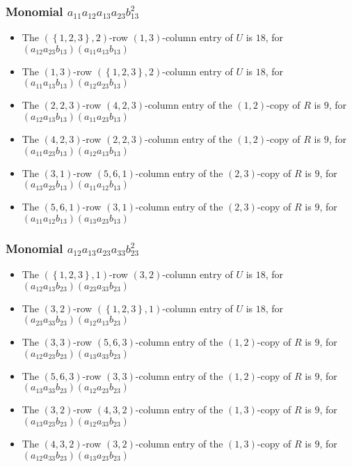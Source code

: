 \documentclass{article}
\begin{document}
\subsubsection{Monomial $ a_{11} a_{12} a_{13} a_{23} b_{13}^{2} $}

\begin{itemize}
\item The $ \left(\left\{1, 2, 3\right\}, 2\right) $-row $ \left(1, 3\right) $-column entry of $U$ is $ 18 $, for $( a_{12} a_{23} b_{13} )( a_{11} a_{13} b_{13} )$ 
\item The $ \left(1, 3\right) $-row $ \left(\left\{1, 2, 3\right\}, 2\right) $-column entry of $U$ is $ 18 $, for $( a_{11} a_{13} b_{13} )( a_{12} a_{23} b_{13} )$ 
\item The $(2, 2, 3)$-row $(4, 2, 3)$-column entry of the $ \left(1, 2\right) $-copy of $R$ is $ 9 $, for $( a_{12} a_{13} b_{13} )( a_{11} a_{23} b_{13} )$ 
\item The $(4, 2, 3)$-row $(2, 2, 3)$-column entry of the $ \left(1, 2\right) $-copy of $R$ is $ 9 $, for $( a_{11} a_{23} b_{13} )( a_{12} a_{13} b_{13} )$ 
\item The $(3, 1)$-row $(5, 6, 1)$-column entry of the $ \left(2, 3\right) $-copy of $R$ is $ 9 $, for $( a_{13} a_{23} b_{13} )( a_{11} a_{12} b_{13} )$ 
\item The $(5, 6, 1)$-row $(3, 1)$-column entry of the $ \left(2, 3\right) $-copy of $R$ is $ 9 $, for $( a_{11} a_{12} b_{13} )( a_{13} a_{23} b_{13} )$ 
\end{itemize}
\subsubsection{Monomial $ a_{12} a_{13} a_{23} a_{33} b_{23}^{2} $}

\begin{itemize}
\item The $ \left(\left\{1, 2, 3\right\}, 1\right) $-row $ \left(3, 2\right) $-column entry of $U$ is $ 18 $, for $( a_{12} a_{13} b_{23} )( a_{23} a_{33} b_{23} )$ 
\item The $ \left(3, 2\right) $-row $ \left(\left\{1, 2, 3\right\}, 1\right) $-column entry of $U$ is $ 18 $, for $( a_{23} a_{33} b_{23} )( a_{12} a_{13} b_{23} )$ 
\item The $(3, 3)$-row $(5, 6, 3)$-column entry of the $ \left(1, 2\right) $-copy of $R$ is $ 9 $, for $( a_{12} a_{23} b_{23} )( a_{13} a_{33} b_{23} )$ 
\item The $(5, 6, 3)$-row $(3, 3)$-column entry of the $ \left(1, 2\right) $-copy of $R$ is $ 9 $, for $( a_{13} a_{33} b_{23} )( a_{12} a_{23} b_{23} )$ 
\item The $(3, 2)$-row $(4, 3, 2)$-column entry of the $ \left(1, 3\right) $-copy of $R$ is $ 9 $, for $( a_{13} a_{23} b_{23} )( a_{12} a_{33} b_{23} )$ 
\item The $(4, 3, 2)$-row $(3, 2)$-column entry of the $ \left(1, 3\right) $-copy of $R$ is $ 9 $, for $( a_{12} a_{33} b_{23} )( a_{13} a_{23} b_{23} )$ 
\end{itemize}
\end{document}
